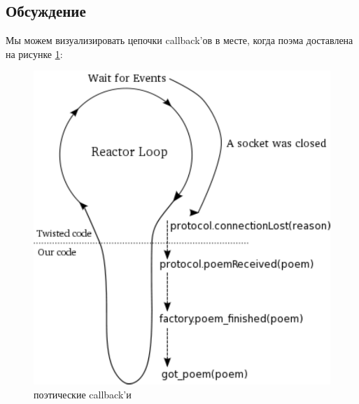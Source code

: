 \subsection{Обсуждение}


Мы можем визуализировать цепочки callback'ов в месте, когда 
поэма доставлена на рисунке \ref{fig:reactor-poem-callback}:

\begin{figure}[h]
\begin{center}
    \includegraphics[height=0.3\textheight]{images/reactor-poem-callback.pdf}
    \caption{поэтические callback'и\label{fig:reactor-poem-callback}}
\end{center}
\end{figure}




